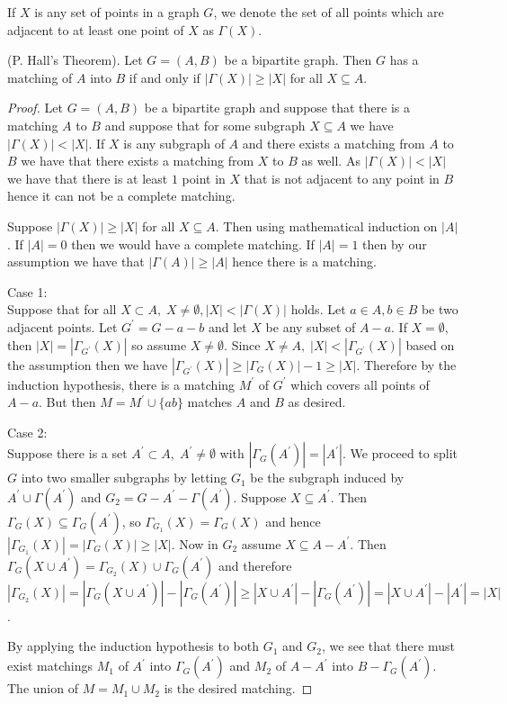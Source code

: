 \documentclass[12pt]{article}
\newenvironment{theorem}[2][Theorem]{\begin{trivlist}
\item[\hskip \labelsep {\bfseries #1}\hskip \labelsep {\bfseries #2.}]}{\end{trivlist}}
\begin{document}
If $X$ is any set of points in a graph $G$, we denote the set of all points which are adjacent to at least one point of $X$ as $\Gamma(X)$.

\begin{theorem}
    {1.1.3}
    (P. Hall's Theorem). Let $G=(A,B)$ be a bipartite graph. Then $G$ has a matching of $A$ into $B$ if and only if $|\Gamma(X)|\geq |X|$ for all $X \subseteq A$.
\end{theorem}

\begin{proof}

    Let $G=(A,B)$ be a bipartite graph and suppose that there is a matching $A$ to $B$ and suppose that for some subgraph $X \subseteq A$ we have $|\Gamma(X)|<|X|$. If $X$ is any subgraph of $A$ and there exists a matching from $A$ to $B$ we have that there exists a matching from $X$ to $B$ as well. As $|\Gamma(X)|<|X|$ we have that there is at least $1$ point in $X$ that is not adjacent to any point in $B$ hence it can not be a complete matching.

    Suppose $|\Gamma(X)|\geq |X|$ for all $X\subseteq A$. Then using mathematical induction on $|A|$. If $|A|=0$ then we would have a complete matching. If $|A|=1$ then by our assumption we have that $|\Gamma(A)|\geq |A|$ hence there is a matching.


    Case 1: \\

    Suppose that for all $X \subset A,\; X\not = \emptyset, |X|< |\Gamma(X)|$ holds. Let $a\in A,b \in B$ be two adjacent points. Let $G^{\prime}= G - a - b$ and let $X$ be any subset of $A-a$. If $X = \emptyset$, then $|X|=|\Gamma_{G^\prime}(X)|$ so assume $X \not = \emptyset$. Since $X\not = A,\; |X|< |\Gamma_{G^\prime}(X)|$ based on the assumption then we have $|\Gamma_{G^\prime}(X)|\geq |\Gamma_{G}(X)|-1\geq|X|$. Therefore by the induction hypothesis, there is a matching $M^\prime$ of $G^\prime$ which covers all points of $A-a$. But then $M=M^\prime \cup \{ab\}$ matches $A$ and $B$ as desired.

    Case 2:\\
    Suppose there is a set $A^\prime \subset A, \; A^\prime \not = \emptyset$ with $|\Gamma_G(A^\prime)|=|A^\prime|$. We proceed to split $G$ into two smaller subgraphs by letting $G_1$ be the subgraph induced by $A^\prime \cup \Gamma(A^\prime)$ and $G_2=G-A^\prime-\Gamma(A^\prime)$. Suppose $X\subseteq A^\prime$. Then $\Gamma_G(X)\subseteq \Gamma_G(A^\prime)$, so $\Gamma_{G_1}(X)=\Gamma_G(X)$ and hence $|\Gamma_{G_1}(X)|=|\Gamma_G(X)|\geq |X|$. Now in $G_2$ assume $X\subseteq A- A^\prime$. Then $\Gamma_G(X\cup A^\prime)=\Gamma_{G_2}(X)\cup \Gamma_G(A^\prime)$ and therefore $|\Gamma_{G_2}(X)|=|\Gamma_G(X\cup A^\prime)|-|\Gamma_{G}(A^\prime)|\geq |X\cup A^\prime|-|\Gamma_G(A^\prime)|=|X\cup A^\prime|-|A^\prime|=|X|$.

    By applying the induction hypothesis to both $G_1$ and $G_2$, we see that there must exist matchings $M_1$ of $A^\prime$ into $\Gamma_G(A^\prime)$ and $M_2$ of $A-A^\prime$ into $B-\Gamma_G(A^\prime)$. The union of $M=M_1 \cup M_2$ is the desired matching.


\end{proof}
\end{document}
